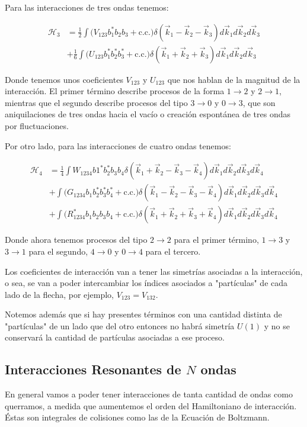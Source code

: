 Para las interacciones de tres ondas tenemos:

\begin{align}
	\mathcal{H}_3 &= \frac{1}{2}\int\big(V_{123}b^*_1b_2b_3+\text{c.c.}\big)\delta(\vec k_1-\vec k_2 -\vec k_3) d\vec k_1d\vec k_2d\vec k_3 \\ &+ \frac{1}{6} \int\big(U_{123}b^*_1b^*_2b^*_3+\text{c.c.}\big)\delta(\vec k_1 + \vec k_2 + \vec k_3) d\vec k_1d\vec k_2d\vec k_3
\end{align} 

Donde tenemos unos coeficientes $V_{123}$ y $U_{123}$ que nos hablan de la magnitud de la interacción. El primer término describe procesos de la forma $1\rightarrow2$ y  $2\rightarrow1$, mientras que el segundo describe procesos del tipo $3\rightarrow0$ y $0\rightarrow3$, que son aniquilaciones de tres ondas hacia el vacío o creación espontánea de tres ondas por fluctuaciones. %

Por otro lado, para las interacciones de cuatro ondas tenemos:

\begin{align}
	\mathcal{H}_4 &= \frac{1}{4} \int W_{1234}b1^*b_2^*b_3b_4\delta(\vec k_1+\vec k_2-\vec k_3-\vec k_4) d\vec k_1d\vec k_2d\vec k_3d\vec k_4 \\
	&+\int \big(G_{1234}b_1b_2^*b_3^*b_4^* + \text{c.c.}\big) \delta(\vec k_1-\vec k_2-\vec k_3-\vec k_4) d\vec k_1d\vec k_2d\vec k_3d\vec k_4 \\
	&+\int \big(R^*_{1234}b_1b_2b_3b_4 + \text{c.c.}\big) \delta(\vec k_1+\vec k_2+\vec k_3+\vec k_4) d\vec k_1d\vec k_2d\vec k_3d\vec k_4
\end{align}

Donde ahora tenemos procesos del tipo $2\rightarrow2$ para el primer término, $1\rightarrow3$ y $3\rightarrow1$ para el segundo, $4\rightarrow0$ y $0\rightarrow4$ para el tercero.
 
Los coeficientes de interacción van a tener las simetrías asociadas a la interacción, o sea, se van a poder intercambiar los índices asociados a "partículas" de cada lado de la flecha, por ejemplo, $V_{123}=V_{132}$.

Notemos además que si hay presentes términos con una cantidad distinta de "partículas" de un lado que del otro entonces no habrá simetría $U(1)$ y no se conservará la cantidad de partículas asociadas a ese proceso. 


\subsection*{Interacciones Resonantes de $N$ ondas} %
En general vamos a poder tener interacciones de tanta cantidad de ondas como querramos, a medida que aumentemos el orden del Hamiltoniano de interacción. Éstas son integrales de colisiones como las de la Ecuación de Boltzmann.

